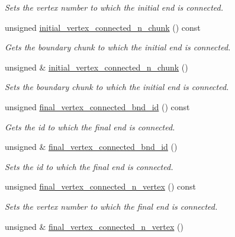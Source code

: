\begin{DoxyCompactItemize}
\begin{DoxyCompactList}\small\item\em Sets the vertex number to which the initial end is connected. \end{DoxyCompactList}\item 
unsigned \hyperlink{classoomph_1_1TriangleMeshCurveSection_ae2c3f9b3c2e2594bea76360c99805790}{initial\+\_\+vertex\+\_\+connected\+\_\+n\+\_\+chunk} () const
\begin{DoxyCompactList}\small\item\em Gets the boundary chunk to which the initial end is connected. \end{DoxyCompactList}\item 
unsigned \& \hyperlink{classoomph_1_1TriangleMeshCurveSection_a9dd1f7bcd31629354a6c59fd0479b189}{initial\+\_\+vertex\+\_\+connected\+\_\+n\+\_\+chunk} ()
\begin{DoxyCompactList}\small\item\em Sets the boundary chunk to which the initial end is connected. \end{DoxyCompactList}\item 
unsigned \hyperlink{classoomph_1_1TriangleMeshCurveSection_af1acd60f443c9ef93df9994587ebfcad}{final\+\_\+vertex\+\_\+connected\+\_\+bnd\+\_\+id} () const
\begin{DoxyCompactList}\small\item\em Gets the id to which the final end is connected. \end{DoxyCompactList}\item 
unsigned \& \hyperlink{classoomph_1_1TriangleMeshCurveSection_a2e75e110f491d19310afa66140e3cd1a}{final\+\_\+vertex\+\_\+connected\+\_\+bnd\+\_\+id} ()
\begin{DoxyCompactList}\small\item\em Sets the id to which the final end is connected. \end{DoxyCompactList}\item 
unsigned \hyperlink{classoomph_1_1TriangleMeshCurveSection_a6fa5fb8407dfe3f0d6624ceb0ac822a5}{final\+\_\+vertex\+\_\+connected\+\_\+n\+\_\+vertex} () const
\begin{DoxyCompactList}\small\item\em Sets the vertex number to which the final end is connected. \end{DoxyCompactList}\item 
unsigned \& \hyperlink{classoomph_1_1TriangleMeshCurveSection_a29571c3c921d5bd8118d9e0b15f4a6e3}{final\+\_\+vertex\+\_\+connected\+\_\+n\+\_\+vertex} ()

\end{DoxyCompactItemize}
